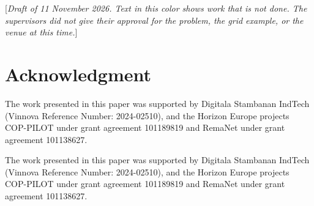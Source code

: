 \documentclass[conference]{IEEEtran}
\theoremstyle{plain}
\theoremstyle{definition}
\newcommand{\pending}[1]{\textcolor{fence}{[\textit{#1}]}}
\begin{document}
\noindent\pending{Draft of 11 November 2026. Text in this color shows work that is not
done. The supervisors did not give their approval for the problem, the grid example, or the
venue at this time.}












\ifsrds
  \appendices
  
  \section*{Acknowledgment}
  The work presented in this paper was supported by Digitala Stambanan IndTech (Vinnova
  Reference Number: 2024-02510), and the Horizon Europe projects COP-PILOT under grant
  agreement 101189819 and RemaNet under grant agreement 101138627.
  
  
\else
\begin{acks}
  The work presented in this paper was supported by Digitala Stambanan IndTech (Vinnova
  Reference Number: 2024-02510), and the Horizon Europe projects COP-PILOT under grant
  agreement 101189819 and RemaNet under grant agreement 101138627.
\end{acks}
  
  
  \appendix
  
\fi
\end{document}
